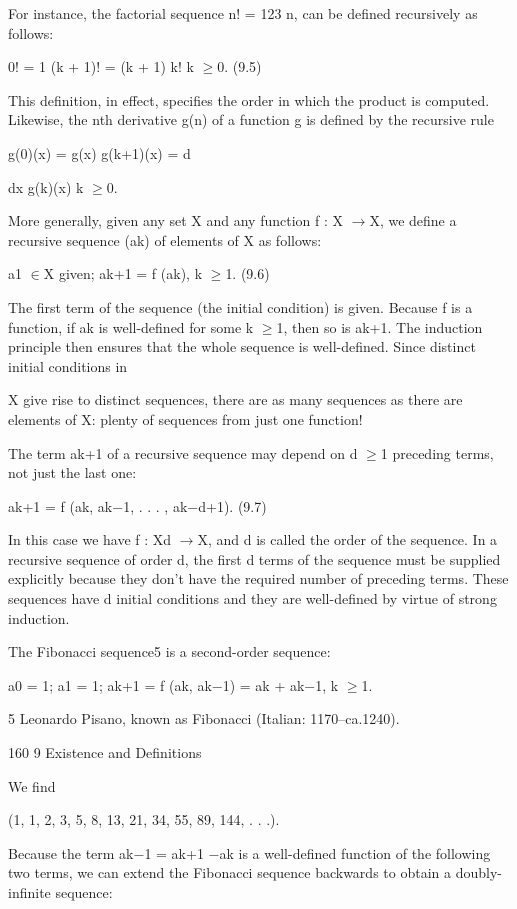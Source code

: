\documentclass[11pt]{article}
\theoremstyle{plain}
\theoremstyle{definition}
\begin{document}
For instance, the factorial sequence n! = 1\textperiodcentered{}2\textperiodcentered{}3 \textperiodcentered{} \textperiodcentered{} \textperiodcentered{} n, can be defined recursively as follows:

0! = 1 (k + 1)! = (k + 1) \textperiodcentered{} k! k $\geq$0. (9.5)

This definition, in effect, specifies the order in which the product is computed. Likewise, the nth derivative g(n) of a function g is defined by the recursive rule

g(0)(x) = g(x) g(k+1)(x) = d

dx g(k)(x) k $\geq$0.

More generally, given any set X and any function f : X $\to$X, we define a recursive sequence (ak) of elements of X as follows:

a1 $\in$X given; ak+1 = f (ak), k $\geq$1. (9.6)

The first term of the sequence (the initial condition) is given. Because f is a function, if ak is well-defined for some k $\geq$1, then so is ak+1. The induction principle then ensures that the whole sequence is well-defined. Since distinct initial conditions in

X give rise to distinct sequences, there are as many sequences as there are elements of X: plenty of sequences from just one function!

The term ak+1 of a recursive sequence may depend on d $\geq$1 preceding terms, not just the last one:

ak+1 = f (ak, ak$-$1, . . . , ak$-$d+1). (9.7)

In this case we have f : Xd $\to$X, and d is called the order of the sequence. In a recursive sequence of order d, the first d terms of the sequence must be supplied explicitly because they don't have the required number of preceding terms. These sequences have d initial conditions and they are well-defined by virtue of strong induction.

The Fibonacci sequence5 is a second-order sequence:

a0 = 1; a1 = 1; ak+1 = f (ak, ak$-$1) = ak + ak$-$1, k $\geq$1.

5 Leonardo Pisano, known as Fibonacci (Italian: 1170--ca.1240).

160 9 Existence and Definitions

We find

(1, 1, 2, 3, 5, 8, 13, 21, 34, 55, 89, 144, . . .).

Because the term ak$-$1 = ak+1 $-$ak is a well-defined function of the following two terms, we can extend the Fibonacci sequence backwards to obtain a doubly-infinite sequence:
\end{document}

